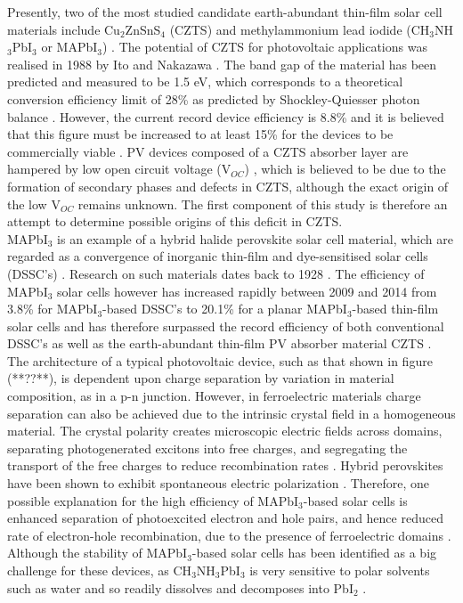 Presently, two of the most studied candidate earth-abundant thin-film solar cell materials include Cu$_2$ZnSnS$_4$ (CZTS) and methylammonium lead iodide (CH$_3$NH$_3$PbI$_3$ or MAPbI$_3$) \cite{CZTS_vs_MAPI}. The potential of CZTS for photovoltaic applications was realised in 1988 by Ito and Nakazawa \cite{first_CZTS}. The band gap of the material has been predicted \cite{CZTS_bandgap_theory} and measured \cite{CZTS_bandgap_exp} to be 1.5 eV, which corresponds to a theoretical conversion efficiency limit of 28\% as predicted by Shockley-Quiesser photon balance \cite{SQ_1961}. However, the current record device efficiency is 8.8\% \cite{CZTS_record} and it is believed that this figure must be increased to at least 15\% for the devices to be commercially viable \cite{SS}. PV devices composed of a CZTS absorber layer are hampered by low open circuit voltage (V$_{OC}$) \cite{SS}, which is believed to be due to the formation of secondary phases \cite{CZTS_phases} and defects \cite{CZTS_defects} in CZTS, although the exact origin of the low V$_{OC}$ remains unknown. The first component of this study is therefore an attempt to determine possible origins of this deficit in CZTS.\\

MAPbI$_3$ is an example of a hybrid halide perovskite solar cell material, which are regarded as a convergence of inorganic thin-film and dye-sensitised solar cells (DSSC's) \cite{Federico}. Research on such materials dates back to 1928 \cite{Jarv_7}. The efficiency of MAPbI$_3$ solar cells however has increased rapidly between 2009 and 2014 from 3.8\% for MAPbI$_3$-based DSSC's to 20.1\% for a planar MAPbI$_3$-based thin-film solar cells \cite{CZTS_vs_MAPI} and has therefore surpassed the record efficiency of both conventional DSSC's as well as the earth-abundant thin-film PV absorber material CZTS \cite{Federico}. The architecture of a typical photovoltaic device, such as that shown in figure (**??**), is dependent upon charge separation by variation in material composition, as in a p-n junction. However, in ferroelectric materials charge separation can also be achieved due to the intrinsic crystal field in a homogeneous material. The crystal polarity creates microscopic electric fields across domains, separating photogenerated excitons into free charges, and segregating the transport of the free charges to reduce recombination rates \cite{keith}. Hybrid perovskites have been shown to exhibit spontaneous electric polarization \cite{Jarv}.
Therefore, one possible explanation for the high efficiency of MAPbI$_3$-based solar cells is enhanced separation of photoexcited electron and hole pairs, and hence reduced rate of electron-hole recombination, due to the presence of ferroelectric domains \cite{Jarv, Federico}. Although the stability of MAPbI$_3$-based solar cells has been identified as a big challenge for these devices, as CH$_3$NH$_3$PbI$_3$ is very sensitive to polar solvents such as water and so readily dissolves and decomposes into PbI$_2$ \cite{MAPI}. \\

